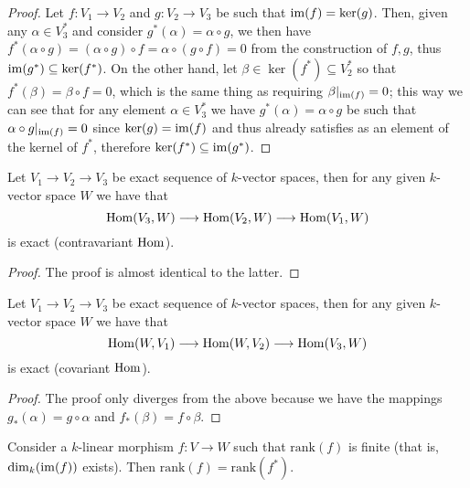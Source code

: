 \begin{proof}
  Let \(f: V_1 \to V_2\) and \(g: V_2 \to V_3\) be such that \(\operatorname{im}(f) =
  \ker(g)\). Then, given any \(\alpha \in V_3^\ast\) and consider
  \(g^\ast(\alpha) = \alpha \circ g\), we then have \(f^\ast(\alpha \circ g) =
  (\alpha \circ g) \circ f = \alpha \circ (g \circ f) = 0\) from the
  construction of \(f, g\), thus \(\operatorname{im}(g^\ast) \subseteq \ker(f^\ast)\). On the
  other hand, let \(\beta \in \ker(f^\ast) \subseteq V_2^\ast\) so that
  \(f^\ast(\beta) = \beta \circ f = 0\), which is the same thing as requiring
  \(\beta|_{\operatorname{im}(f)} = 0\); this way we can see that for any element \(\alpha \in
  V_3^\ast\) we have \(g^\ast(\alpha) = \alpha \circ g\) be such that \(\alpha
  \circ g|_{\operatorname{im}(f)} = 0\) since \(\ker(g) = \operatorname{im}(f)\) and thus already satisfies
  as an element of the kernel of \(f^\ast\), therefore \(\ker(f^\ast) \subseteq
  \operatorname{im}(g^\ast)\).
\end{proof}

\begin{proposition}
  Let \(V_1 \to V_2 \to V_3\) be exact sequence of \(k\)-vector spaces, then for
  any given \(k\)-vector space \(W\) we have that
  \[
    \operatorname{Hom}(V_3, W) \longrightarrow \operatorname{Hom}(V_2, W) \longrightarrow \operatorname{Hom}(V_1, W)
  \]
  is exact (contravariant \(\operatorname{Hom}\)).
\end{proposition}

\begin{proof}
  The proof is almost identical to the latter.
\end{proof}

\begin{proposition}
  Let \(V_1 \to V_2 \to V_3\) be exact sequence of \(k\)-vector spaces, then for
  any given \(k\)-vector space \(W\) we have that
  \[
    \operatorname{Hom}(W, V_1) \longrightarrow \operatorname{Hom}(W, V_2) \longrightarrow \operatorname{Hom}(V_3, W)
  \]
  is exact (covariant \(\operatorname{Hom}\)).
\end{proposition}

\begin{proof}
  The proof only diverges from the above because we have the mappings
  \(g_\ast(\alpha) = g \circ \alpha\) and \(f_\ast(\beta) = f \circ \beta\).
\end{proof}

\begin{proposition}
  Consider a \(k\)-linear morphism \(f : V \to W\) such that \(\mathrm{rank}(f)\) is
  finite (that is, \(\dim_k(\operatorname{im}(f))\) exists). Then \(\mathrm{rank}(f) =
  \mathrm{rank}(f^\ast)\).
\end{proposition}

